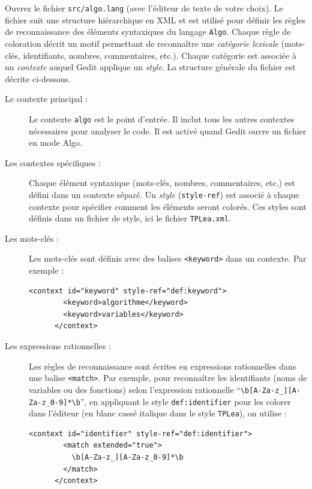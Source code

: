 \documentclass{td}
\begin{document}
\begin{exercice}

  Ouvrez le fichier \lstinline{src/algo.lang} (avec l'éditeur de texte de votre choix).
  Le fichier suit une structure hiérarchique en XML et est utilisé pour définir les règles de reconnaissance des éléments syntaxiques du langage \texttt{Algo}.
  Chaque règle de coloration décrit un motif permettant de reconnaître une \emph{catégorie lexicale} (mots-clés, identifiants, nombres, commentaires, etc.).
  Chaque catégorie est associée à un \emph{contexte} auquel Gedit applique un \emph{style}.
  La structure générale du fichier est décrite ci-dessous.
  
  \begin{description}
  \item[Le contexte principal :]
    Le contexte \texttt{algo} est le point d'entrée. Il inclut tous les autres contextes nécessaires pour analyser le code.
    Il est activé quand Gedit ouvre un fichier en mode Algo.
  \item[Les contextes spécifiques :]
    Chaque élément syntaxique (mots-clés, nombres, commentaires, etc.) est défini dans un contexte séparé.
    Un \emph{style} (\texttt{style-ref}) est associé à chaque contexte pour spécifier comment les éléments seront colorés.
    Ces styles sont définis dans un fichier de style, ici le fichier \lstinline{TPLea.xml}.
  \item[Les mots-clés :]
    Les mots-clés sont définis avec des balises \texttt{<keyword>} dans un contexte. Par exemple : 
    \begin{lstlisting}[gobble=6]
      <context id="keyword" style-ref="def:keyword">
        <keyword>algorithme</keyword>
        <keyword>variables</keyword>
      </context>
    \end{lstlisting}
  \item[Les expressions rationnelles :]
    Les règles de reconnaissance sont écrites en expressions rationnelles dans une balise \texttt{<match>}.
    Par exemple, pour reconnaître les identifiants (noms de variables ou des fonctions)
    selon l'expression rationnelle ``\lstinline{\b[A-Za-z_][A-Za-z_0-9]*\b}'',
    en appliquant le style \lstinline{def:identifier} pour les colorer dans l'éditeur (en blanc cassé italique dans le style \lstinline{TPLea}), on utilise :
    \begin{lstlisting}[gobble=6]
      <context id="identifier" style-ref="def:identifier">
        <match extended="true">
          \b[A-Za-z_][A-Za-z_0-9]*\b
        </match>
      </context>
    \end{lstlisting}
  \end{description}


\end{exercice}
\end{document}

